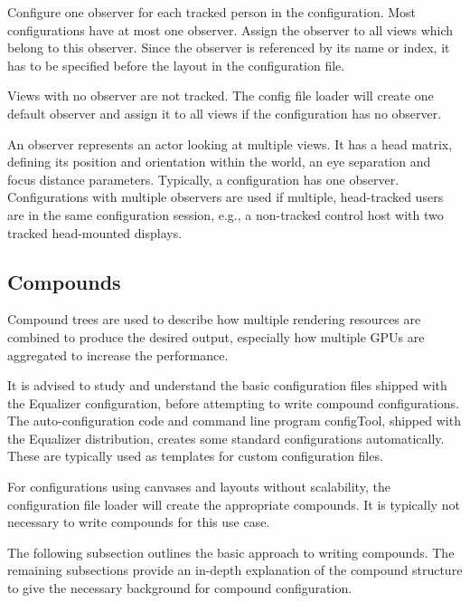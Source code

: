 \documentclass[10pt,a4]{scrartcl}
\begin{document}
Configure one \textsf{observer} for each tracked person in the
configuration. Most configurations have at most one observer. Assign the
observer to all views which belong to this observer. Since the observer
is referenced by its name or index, it has to be specified before the
layout in the configuration file.

Views with no observer are not tracked. The config file loader will
create one default observer and assign it to all views if the
configuration has no observer.

An observer represents an actor looking at multiple views. It has a head matrix,
defining its position and orientation within the world, an eye separation and
focus distance parameters. Typically, a configuration has one
observer. Configurations with multiple observers are used if multiple,
head-tracked users are in the same configuration session, e.g., a non-tracked
control host with two tracked head-mounted displays.

\subsection{\label{sCompounds}Compounds}

Compound trees are used to describe how multiple rendering resources are
combined to produce the desired output, especially how multiple GPUs are
aggregated to increase the performance.

It is advised to study and understand the basic configuration files shipped with
the Equalizer configuration, before attempting to write compound
configurations. The auto-configuration code and command line program
\textsf{configTool}, shipped with the Equalizer distribution, creates some
standard configurations automatically. These are typically used as templates for
custom configuration files.

For configurations using canvases and layouts without scalability, the
configuration file loader will create the appropriate compounds. It is
typically not necessary to write compounds for this use case.

The following subsection outlines the basic approach to writing
compounds. The remaining subsections provide an in-depth explanation of
the compound structure to give the necessary background for compound
configuration.
\end{document}
